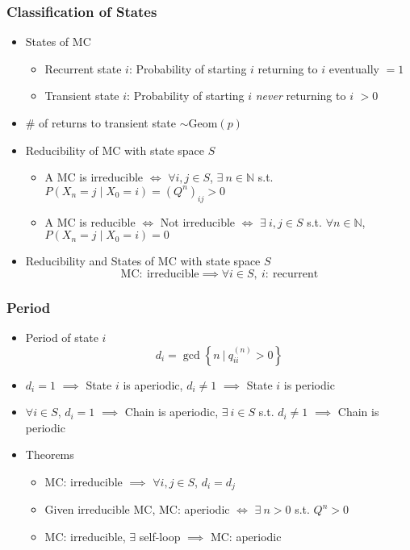 \subsubsection*{Classification of States}
\begin{itemize}
    \item States of MC
    \begin{itemize}
        \item Recurrent state $i$: Probability of starting $i$ returning to $i$ eventually $=1$
        \item Transient state $i$: Probability of starting $i$ \textit{never} returning to $i$ $>0$
    \end{itemize}
    \item \# of returns to transient state $\sim\text{Geom}(p)$
    \item Reducibility of MC with state space $S$
    \begin{itemize}
        \item A MC is irreducible $\iff$ $\forall i,j\in S$, $\exists~n\in\mathbb{N}$ s.t. $P(X_n=j\mid X_0=i)=(Q^n)_{ij}>0$
        \item A MC is reducible $\iff$ Not irreducible $\iff$ $\exists~i,j\in S$ s.t. $\forall n\in\mathbb{N}$, $P(X_n=j\mid X_0=i)=0$
    \end{itemize}
    \item Reducibility and States of MC with state space $S$
    \begin{equation}
        \text{MC}:~\text{irreducible}\implies\forall i\in S,~i:~\text{recurrent}
    \end{equation}
\end{itemize}

\subsubsection*{Period}
\begin{itemize}
    \item Period of state $i$
    \begin{equation}
        d_i=\gcd\left\{n~\Big|~q_{ii}^{(n)}>0\right\}
    \end{equation}
    \item $d_i=1$ $\implies$ State $i$ is aperiodic, $d_i\neq 1$ $\implies$ State $i$ is periodic
    \item $\forall i\in S$, $d_i=1$ $\implies$ Chain is aperiodic, $\exists~i\in S$ s.t. $d_i\neq 1$ $\implies$ Chain is periodic
    \item Theorems
    \begin{itemize}
        \item MC: irreducible $\implies$ $\forall i,j\in S$, $d_i=d_j$
        \item Given irreducible MC, MC: aperiodic $\iff$ $\exists~n>0$ s.t. $Q^n>0$
        \item MC: irreducible, $\exists$ self-loop $\implies$ MC: aperiodic
    \end{itemize}
\end{itemize}

